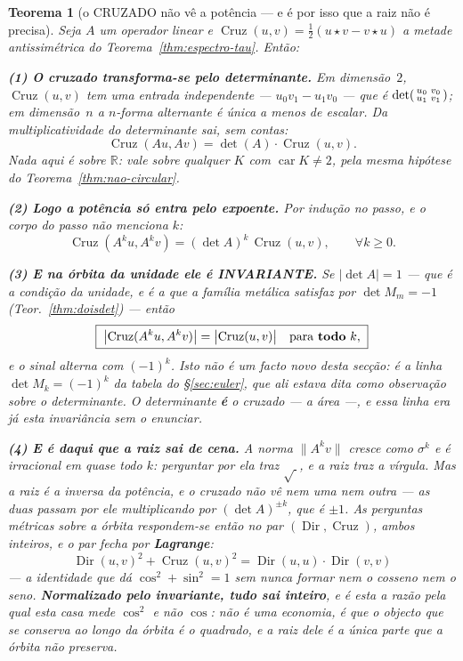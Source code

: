 \documentclass[11pt,a4paper]{article}
\newtheorem{teorema}{Teorema}
\begin{document}
\begin{teorema}[o CRUZADO não vê a potência --- e é por isso que a raiz não é
precisa]\label{thm:cruzado-potencia}
Seja $A$ um operador linear e $\operatorname{Cruz}(u,v)=\tfrac12(u\star v-v\star u)$ a
metade antissimétrica do Teorema~\ref{thm:espectro-tau}. Então:

\textbf{(1) O cruzado transforma-se pelo determinante.} Em dimensão~$2$,
$\operatorname{Cruz}(u,v)$ tem uma entrada independente --- $u_0v_1-u_1v_0$ --- que
\emph{é} $\det\begin{psmallmatrix}u_0&v_0\\u_1&v_1\end{psmallmatrix}$; em dimensão~$n$ a
$n$-forma alternante é única a menos de escalar. Da multiplicatividade do determinante
sai, sem contas:
\[
\boxed{\;\operatorname{Cruz}(Au,Av)=\det(A)\cdot\operatorname{Cruz}(u,v). \;}
\]
\emph{Nada aqui é sobre $\mathbb{R}$}: vale sobre qualquer $K$ com $\operatorname{car}K\neq2$,
pela mesma hipótese do Teorema~\ref{thm:nao-circular}.

\textbf{(2) Logo a potência só entra pelo expoente.} Por indução no passo, e o corpo do
passo não menciona $k$:
\[
\operatorname{Cruz}(A^{k}u,A^{k}v)=(\det A)^{k}\,\operatorname{Cruz}(u,v),
\qquad \forall k\geq0 .
\]

\textbf{(3) E na órbita da unidade ele é INVARIANTE.} Se $|\det A|=1$ --- que é a condição
da unidade, e é a que a família metálica satisfaz por $\det M_m=-1$
(Teor.~\ref{thm:doisdet}) --- então
\[
\boxed{\;\bigl|\operatorname{Cruz}(A^{k}u,A^{k}v)\bigr|
=\bigl|\operatorname{Cruz}(u,v)\bigr|\quad\text{para \textbf{todo} }k,\;}
\]
e o sinal alterna com $(-1)^{k}$. \emph{Isto não é um facto novo desta secção}: é a linha
$\det M_k=(-1)^{k}$ da tabela do §\ref{sec:euler}, que ali estava dita como observação
sobre o determinante. O determinante \textbf{é} o cruzado --- a área ---, e essa linha era
já esta invariância sem o enunciar.

\textbf{(4) E é daqui que a raiz sai de cena.} A norma $\|A^{k}v\|$ cresce como $\sigma^{k}$
e é irracional em quase todo $k$: perguntar por ela traz $\sqrt{\ }$, e a raiz traz a
vírgula. Mas a raiz é a \emph{inversa} da potência, e o cruzado não vê nem uma nem outra
--- as duas passam por ele multiplicando por $(\det A)^{\pm k}$, que é $\pm1$. As perguntas
métricas sobre a órbita respondem-se então no par $(\operatorname{Dir},\operatorname{Cruz})$,
ambos inteiros, e o par fecha por \textbf{Lagrange}:
\[
\boxed{\;\operatorname{Dir}(u,v)^{2}+\operatorname{Cruz}(u,v)^{2}
=\operatorname{Dir}(u,u)\cdot\operatorname{Dir}(v,v)\;}
\]
--- a identidade que dá $\cos^{2}+\sin^{2}=1$ sem nunca formar nem o cosseno nem o seno.
\textbf{Normalizado pelo invariante, tudo sai inteiro}, e é esta a razão pela qual esta
casa mede $\cos^{2}$ e não $\cos$: não é uma economia, é que o objecto que se conserva ao
longo da órbita é o quadrado, e a raiz dele é a única parte que a órbita não preserva.


\end{teorema}
\end{document}
